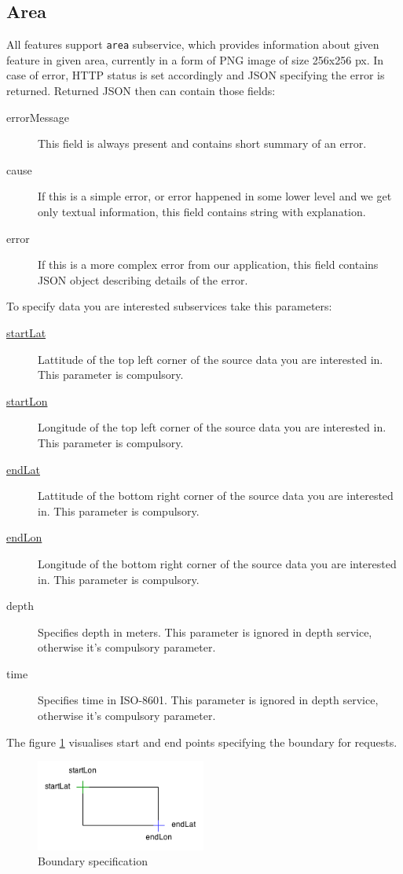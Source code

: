 \documentclass[11pt,a4paper,titlepage,oneside]{report}
\begin{document}
\subsection{Area}

All features support \texttt{area} subservice, which provides information about given feature in given area, currently in a form of \gls{PNG} image of size 256x256 px. In case of error, \gls{HTTP} status is set accordingly and JSON specifying the error is returned. Returned JSON then can contain those fields:
\begin{description}
	\item[errorMessage] This field is always present and contains short summary of an error.
	\item[cause] If this is a simple error, or error happened in some lower level and we get only textual information, this field contains string with explanation.
	\item[error] If this is a more complex error from our application, this field contains JSON object describing details of the error.
\end{description}

To specify data you are interested subservices take this parameters:
\begin{description}
	\item[\underline{startLat}] Lattitude of the top left corner of the source data you are interested in. This parameter is compulsory.
	\item[\underline{startLon}] Longitude of the top left corner of the source data you are interested in. This parameter is compulsory.
	\item[\underline{endLat}] Lattitude of the bottom right corner of the source data you are interested in. This parameter is compulsory.
	\item[\underline{endLon}] Longitude of the bottom right corner of the source data you are interested in. This parameter is compulsory.
	\item[depth] Specifies depth in meters. This parameter is ignored in depth service, otherwise it's compulsory parameter.
	\item[time] Specifies time in ISO-8601. This parameter is ignored in depth service, otherwise it's compulsory parameter.
\end{description}

The figure \ref{fig:rest_api_boundary} visualises start and end points specifying the boundary for requests.

\begin{figure}[h]
	\centering
	\includegraphics[height=3cm]{img/REST_boundary.png}
	\caption{Boundary specification}
	\label{fig:rest_api_boundary}
\end{figure}
\end{document}
